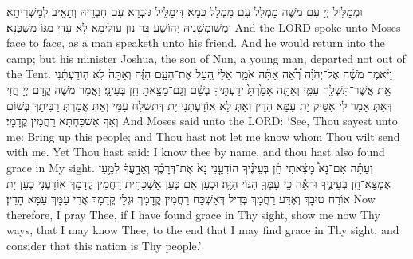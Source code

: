{{וּמְמַלֵּיל יְיָ עִם מֹשֶׁה מַמְלַל עִם מַמְלַל כְּמָא דִּימַלֵּיל גּוּבְרָא עִם חַבְרֵיהּ וְתָאֵיב לְמַשְׁרִיתָא וּמְשׁוּמְשָׁנֵיהּ יְהוֹשֻׁעַ בַּר נוּן עוּלֵימָא לָא עָדֵי מִגּוֹ מַשְׁכְּנָא׃}
{And the LORD spoke unto Moses face to face, as a man speaketh unto his friend. And he would return into the camp; but his minister Joshua, the son of Nun, a young man, departed not out of the Tent.}{}
{וַיֹּ֨אמֶר מֹשֶׁ֜ה אֶל־יְהֹוָ֗ה רְ֠אֵ֠ה אַתָּ֞ה אֹמֵ֤ר אֵלַי֙ הַ֚עַל אֶת־הָעָ֣ם הַזֶּ֔ה וְאַתָּה֙ לֹ֣א הֽוֹדַעְתַּ֔נִי אֵ֥ת אֲשֶׁר־תִּשְׁלַ֖ח עִמִּ֑י וְאַתָּ֤ה אָמַ֙רְתָּ֙ יְדַעְתִּ֣יךָֽ בְשֵׁ֔ם וְגַם־מָצָ֥אתָ חֵ֖ן בְּעֵינָֽי׃
\rashi{}}
{וַאֲמַר מֹשֶׁה קֳדָם יְיָ חֲזִי דְּאַתְּ אָמַר לִי אַסֵּיק יָת עַמָּא הָדֵין וְאַתְּ לָא אוֹדַעְתַּנִי יָת דְּתִשְׁלַח עִמִּי וְאַתְּ אֲמַרְתְּ רַבִּיתָךְ בְּשׁוֹם וְאַף אַשְׁכַּחְתָּא רַחֲמִין קֳדָמָי׃}
{And Moses said unto the LORD: ‘See, Thou sayest unto me: Bring up this people; and Thou hast not let me know whom Thou wilt send with me. Yet Thou hast said: I know thee by name, and thou hast also found grace in My sight.}{}
{וְעַתָּ֡ה אִם־נָא֩ מָצָ֨אתִי חֵ֜ן בְּעֵינֶ֗יךָ הוֹדִעֵ֤נִי נָא֙ אֶת־דְּרָכֶ֔ךָ וְאֵדָ֣עֲךָ֔ לְמַ֥עַן אֶמְצָא־חֵ֖ן בְּעֵינֶ֑יךָ וּרְאֵ֕ה כִּ֥י עַמְּךָ֖ הַגּ֥וֹי הַזֶּֽה׃
}
{וּכְעַן אִם כְּעַן אַשְׁכַּחִית רַחֲמִין קֳדָמָךְ אוֹדַעְנִי כְעַן יָת אוֹרַח טוּבָךְ וְאֶדַּע רַחֲמָךְ בְּדִיל דְּאַשְׁכַּח רַחֲמִין קֳדָמָךְ וּגְלֵי קֳדָמָךְ אֲרֵי עַמָּךְ עַמָּא הָדֵין׃}
{Now therefore, I pray Thee, if I have found grace in Thy sight, show me now Thy ways, that I may know Thee, to the end that I may find grace in Thy sight; and consider that this nation is Thy people.’}{}
}
